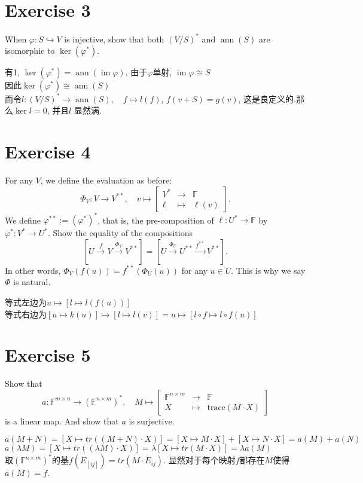 \documentclass[11pt]{ctexart}
\theoremstyle{definition}
\numberwithin{equation}{section}
\newcommand{\op}[1]{\operatorname{#1}}%
\newcommand{\FF}{\mathbb{F}}%
\theoremstyle{definition}
\theoremstyle{remark}
\begin{document}
\section{Exercise 3}
When $\varphi : S \hookrightarrow V$ is injective, show that both $(V/S)^\ast$ and $\operatorname{ann}(S)$ are isomorphic to $\ker (\varphi ^\ast)$. 
\begin{aaa}
    有1, $\ker(\varphi^*)=\op{ann}(\op{im}\varphi)$, 由于$\varphi$单射, $\op{im}\varphi\cong S$\\因此$\ker(\varphi^*)\cong \op{ann}(S)$\\
    而令$l: (V/S)^*\to\op{ann}(S),\quad f\mapsto l(f)$, $f(v+S)=g(v)$, 这是良定义的.那么$\ker l=0$, 并且$l$ 显然满.\\


\end{aaa}

\section{Exercise 4}
For any $V$, we define the evaluation as before:
$$
\Phi _V : V \to V^{\ast\ast}, \quad v \mapsto \begin{bmatrix}V^\ast & \to & \mathbb F \\\ell & \mapsto & \ell (v)\end{bmatrix}.
$$
We define $\varphi^{\ast \ast} := (\varphi ^\ast)^\ast$, that is, the pre-composition of $\ell : U^\ast \to \mathbb F$ by $\varphi ^\ast : V^\ast \to U^\ast$. Show the equality of the compositions 
$$
\left[U \xrightarrow f V \xrightarrow {\Phi_V} V^{\ast\ast} \right] =\left[U \xrightarrow {\Phi_U} U^{\ast\ast} \xrightarrow{f^{\ast\ast}} V^{\ast\ast} \right].
$$
In other words, $\Phi _V(f(u)) = f^{\ast\ast}(\Phi _U(u))$ for any $u \in U$. This is why we say $\Phi$ is natural.

\begin{aaa}
    等式左边为$u\mapsto [l\mapsto l(f(u))]$\\
    等式右边为$[u\mapsto k(u)]\mapsto [l\mapsto l(v)]=u\mapsto [l\circ f\mapsto l\circ f(u)]$
\end{aaa}
\section{Exercise 5}
Show that 
$$
a : \mathbb F^{m \times n} \to (\mathbb F^{n \times m})^\ast ,\quad M \mapsto \begin{bmatrix}\mathbb F^{n \times m} & \to & \mathbb F \\ X& \mapsto & \mathrm{trace}(M\cdot X)\end{bmatrix}
$$
is a linear map. And show that $a$ is surjective.\
\begin{aaa}
    $a(M+N)=[X\mapsto tr((M+N)\cdot X)]=[X\mapsto M\cdot X]+[X\mapsto N\cdot X]=a(M)+a(N)$\\
    $a(\lambda M)=[X\mapsto tr((\lambda M)\cdot X)]=\lambda[X\mapsto tr(M\cdot X)]=\lambda a(M)$\\
    取$(\FF^{n\times m})^*$的基$f(E_[ij])=tr(M\cdot E_{ij})$. 显然对于每个映射$f$都存在$M$使得$a(M)=f.$
\end{aaa}
\end{document}
